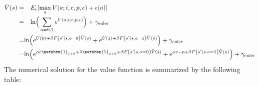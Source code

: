 \documentclass[12pt,english]{article}
\begin{document}
$$
\begin{aligned}
\bar{V}(s) = & \quad E_{\epsilon}[\max_{a} V(a; i, c, p, \epsilon) + \epsilon(a)]\\
= & \quad  \text{ln}\Big(\sum_{a=0,1}e^{ V(a, i, c, p, \epsilon)}  \Big) + \gamma_{\text{euler}}\\
=& \text{ln}\Big(e^{U(0) + \beta F\left(s^{\prime} \mid s, a=0\right) \bar{V}(s)} + e^{U(1)+ \beta F\left(s^{\prime} \mid s, a=1\right) \bar{V}(s)}  \Big) + \gamma_{\text{euler}}\\
=& \text{ln}\Big(e^{\alpha c\mathbbm{1}_{ i > 0} + \lambda\mathbbm{1}_{c > 0} + \beta F\left(s^{\prime} \mid s, a=0\right)\bar{V}(s)} + e^{\alpha c-p + \beta F\left(s^{\prime} \mid s, a=1\right)\bar{V}(s)}  \Big) + \gamma_{\text{euler}} 
\end{aligned}
$$
The numerical solution for the value function is summarized by the following table:
\end{document}
